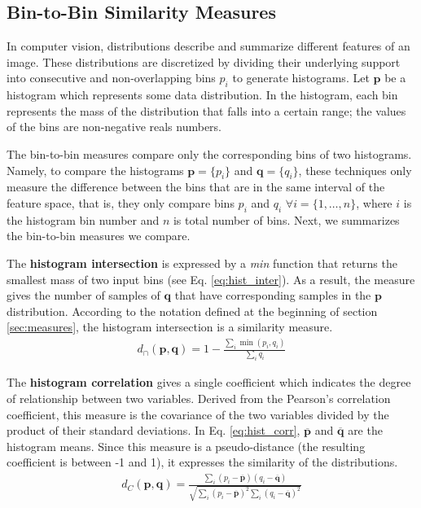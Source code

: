 \subsection{Bin-to-Bin Similarity Measures}
In computer vision, distributions describe and summarize different features of an image. These distributions are discretized by dividing their underlying support into consecutive and non-overlapping bins $p_i$ to generate histograms. Let $\mathbf{p}$ be a histogram which represents some data distribution. In the histogram, each bin represents the mass of the distribution that falls into a certain range; the values of the bins are non-negative reals numbers. 

The bin-to-bin measures compare only the corresponding bins of two histograms. Namely, to compare the histograms  $\mathbf{p} = \{p_i\}$ and $\mathbf{q} = \{q_i\}$, these techniques only measure the difference between the bins that are in the same interval of the feature space, that is, they only compare bins  $p_i$ and $q_i$ $\forall i=\{1, \ldots, n\}$, where $i$ is the histogram bin number and $n$ is total number of bins. Next, we summarizes the bin-to-bin measures we compare.

The \textbf{histogram intersection} \citep{Swain.Ballard:IJCV:1991} is expressed by a \textit{min} function that returns the smallest mass of two input bins (see Eq. \ref{eq:hist_inter}). As a result, the measure gives the number of samples of $\mathbf{q}$ that have corresponding samples in the $\mathbf{p}$ distribution. According to the notation defined at the beginning of section \ref{sec:measures}, the histogram intersection is a similarity measure.
\begin{eqnarray}
d_{\cap}(\mathbf{p}, \mathbf{q}) = 1 - \frac{\sum_{i}\min(p_i, q_i)}{\sum_{i}q_i} \label{eq:hist_inter}
\end{eqnarray}

The \textbf{histogram correlation} gives a single coefficient which indicates the degree of relationship between two variables. Derived from the Pearson's correlation coefficient, this measure is the covariance of the two variables divided by the product of their standard deviations. In Eq. \ref{eq:hist_corr}, $\overline{\mathbf{p}}$ and $\overline{\mathbf{q}}$ are the histogram means. Since this measure is a pseudo-distance (the resulting coefficient is between -1 and 1), it expresses the similarity of the distributions.  
\begin{eqnarray}
d_{C}(\mathbf{p}, \mathbf{q}) = \frac{\sum_{i}(p_i - \overline{\mathbf{p}})(q_i - \overline{\mathbf{q}})}{\sqrt{\sum_{i}(p_i - \overline{\mathbf{p}})^{2}\sum_{i}(q_i - \overline{\mathbf{q}})^{2}}} \label{eq:hist_corr}
\end{eqnarray}

